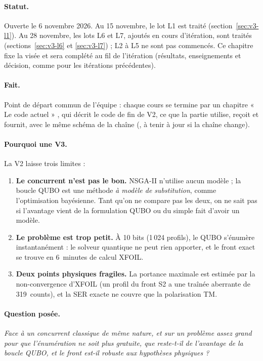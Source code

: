 \documentclass[11pt,a4paper]{report}
\begin{document}
\paragraph{Statut.} Ouverte le 6 novembre 2026. Au 15 novembre, le lot L1 est traité (section~\ref{sec:v3-l1}). Au 28 novembre, les lots L6 et L7, ajoutés en cours d'itération, sont traités (sections~\ref{sec:v3-l6} et \ref{sec:v3-l7}) ; L2 à L5 ne sont pas commencés. Ce chapitre fixe la visée et sera complété au fil de l'itération (résultats, enseignements et décision, comme pour les itérations précédentes).

\paragraph{Fait.} Point de départ commun de l'équipe : chaque cours se termine par un chapitre « Le code actuel » , qui décrit le code de fin de V2, ce que la partie utilise, reçoit et fournit, avec le même schéma de la chaîne (, à tenir à jour si la chaîne change).

\paragraph{Pourquoi une V3.} La V2 laisse trois limites :
\begin{enumerate}
\item \textbf{Le concurrent n'est pas le bon.} NSGA-II n'utilise aucun modèle ; la boucle QUBO est une méthode \emph{à modèle de substitution}, comme l'optimisation bayésienne. Tant qu'on ne compare pas les deux, on ne sait pas si l'avantage vient de la formulation QUBO ou du simple fait d'avoir un modèle.
\item \textbf{Le problème est trop petit.} À 10 bits (1\,024 profils), le QUBO s'énumère instantanément : le solveur quantique ne peut rien apporter, et le front exact se trouve en 6~minutes de calcul XFOIL.
\item \textbf{Deux points physiques fragiles.} La portance maximale est estimée par la non-convergence d'XFOIL (un profil du front S2 a une traînée aberrante de 319~counts), et la SER exacte ne couvre que la polarisation TM.
\end{enumerate}

\paragraph{Question posée.} \emph{Face à un concurrent classique de même nature, et sur un problème assez grand pour que l'énumération ne soit plus gratuite, que reste-t-il de l'avantage de la boucle QUBO, et le front est-il robuste aux hypothèses physiques ?}
\end{document}
